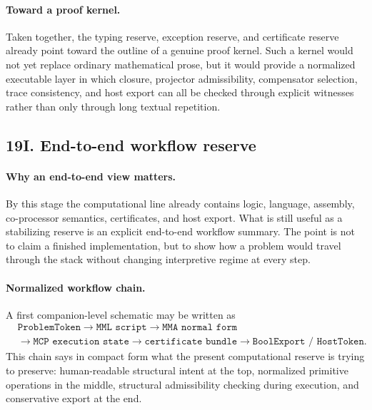 \paragraph{Toward a proof kernel.}
Taken together, the typing reserve, exception reserve, and certificate reserve already point toward the outline of a genuine proof kernel. Such a kernel would not yet replace ordinary mathematical prose, but it would provide a normalized executable layer in which closure, projector admissibility, compensator selection, trace consistency, and host export can all be checked through explicit witnesses rather than only through long textual repetition.


\subsection*{19I. End-to-end workflow reserve}

\paragraph{Why an end-to-end view matters.}
By this stage the computational line already contains logic, language, assembly, co-processor semantics, certificates, and host export. What is still useful as a stabilizing reserve is an explicit end-to-end workflow summary. The point is not to claim a finished implementation, but to show how a problem would travel through the stack without changing interpretive regime at every step.

\paragraph{Normalized workflow chain.}
A first companion-level schematic may be written as
\[
\begin{aligned}
&\texttt{ProblemToken} \longrightarrow \texttt{MML script} \longrightarrow \texttt{MMA normal form}\\
&\longrightarrow \texttt{MCP execution state} \longrightarrow \texttt{certificate bundle} \longrightarrow \texttt{BoolExport / HostToken}.
\end{aligned}
\]
This chain says in compact form what the present computational reserve is trying to preserve: human-readable structural intent at the top, normalized primitive operations in the middle, structural admissibility checking during execution, and conservative export at the end.

